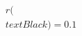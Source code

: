 \documentclass[preview]{standalone}
\begin{document}
\begin{align*}
r(\\textBlack) = 0.1
\end{align*}
\end{document}
